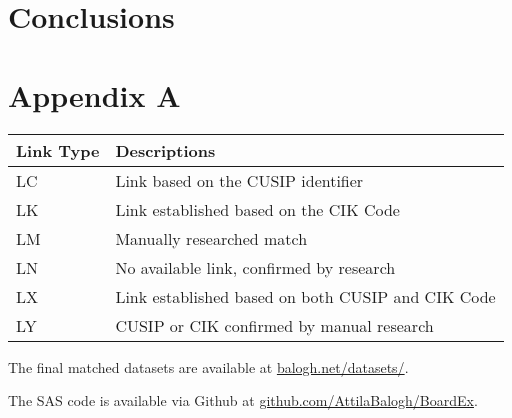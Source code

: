 \documentclass[12pt]{article}
\begin{document}
\section{Conclusions} \label{sec:Conclusions}

\clearpage
\section{Appendix A} \label{sec:Appendix}

\begin{tabular}{ll}
\hline \hline 
Link Type & Descriptions\\ 
\hline 
LC & Link based on the CUSIP identifier\\ 
LK & Link established based on the CIK Code \\ 
LM & Manually researched match \\ 
LN & No available link, confirmed by research \\ 
LX & Link established based on both CUSIP and CIK Code \\ 
LY & CUSIP or CIK confirmed by manual research \\ 
\hline \hline 
\end{tabular} 

\vspace{10mm}

The final matched datasets are available at \href{https://balogh.net/datasets/}{balogh.net/datasets/}.

The SAS code is available via Github at \href{https://github.com/AttilaBalogh/BoardEx}{github.com/AttilaBalogh/BoardEx}.

\clearpage





\end{document}
